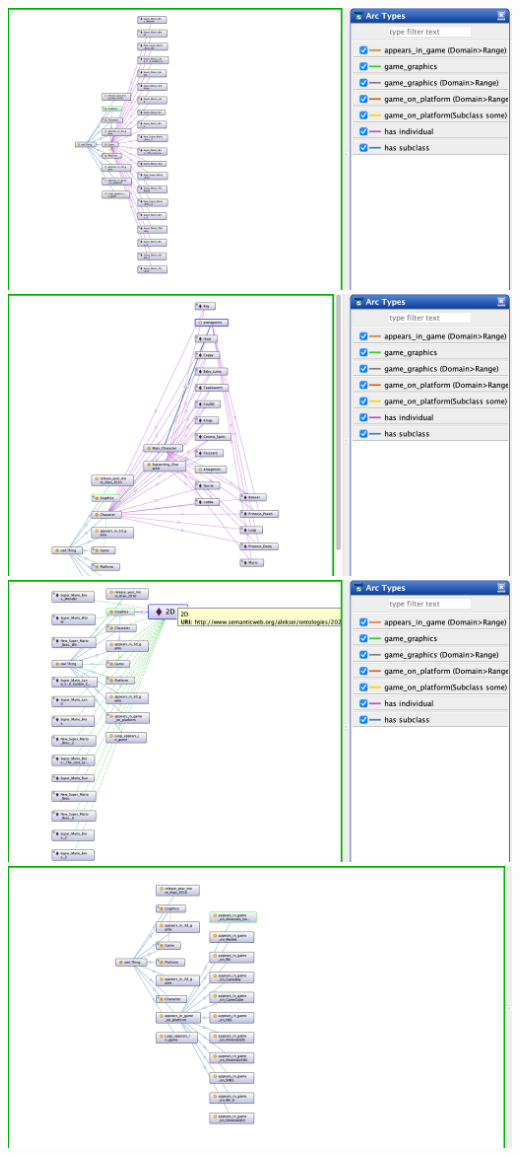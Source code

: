 \documentclass[12pt,onecolumn]{article}
\begin{document}
\includegraphics[width=\textwidth]{image/ontology-2.png}
\includegraphics[width=\textwidth]{image/ontology-3.png}
\includegraphics[width=\textwidth]{image/ontology-4.png}
\includegraphics[width=\textwidth]{image/ontology-5.png}
\end{document}
